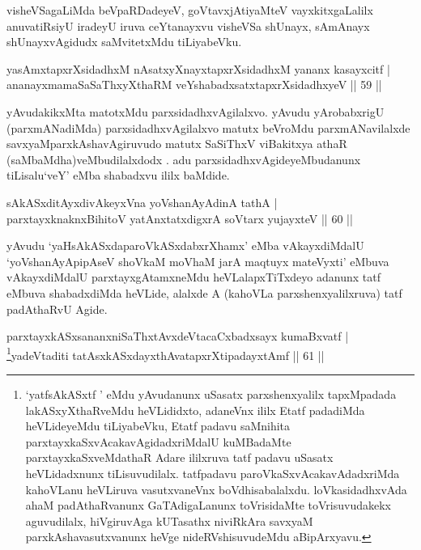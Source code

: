 \begin{artha}
visheVSagaLiMda beVpaRDadeyeV, goVtavxjAtiyaMteV vayxkitxgaLalilx anuvatiRsiyU iradeyU iruva ceYtanayxvu visheVSa shUnayx, sAmAnayx shUnayxvAgidudx saMvitetxMdu tiLiyabeVku.
\end{artha}


\begin{shl}
yasAmxtapxrXsidadhxM nAsatxyXnayxtapxrXsidadhxM yananx kasayxcitf |\\
ananayxmamaSaSaThxyXthaRM veYshabadxsatxtapxrXsidadhxyeV \hfill || 59 ||
\end{shl}

\begin{artha}
yAvudakikxMta matotxMdu parxsidadhxvAgilalxvo. yAvudu yArobabxrigU  (parxmANadiMda) parxsidadhxvAgilalxvo matutx beVroMdu parxmANavilalxde savxyaMparxkAshavAgiruvudo matutx SaSiThxV viBakitxya athaR (saMbaMdha)veMbudilalxdodx . adu parxsidadhxvAgideyeMbudanunx tiLisalu`veY' eMba shabadxvu ililx baMdide.
\end{artha}


\begin{shl}
sAkASxditAyxdivAkeyxVna yoV\s shanAyAdinA tathA |\\
parxtayxknaknxBihitoV yatAnxtatxdigxrA soV\s tarx yujayxteV \hfill || 60 ||
\end{shl}

\begin{artha}
yAvudu `yaHsAkASxdaparoVkASxdabxrXhamx' eMba vAkayxdiMdalU `yoV\s shanAyApipAseV shoVkaM moVhaM jarA maqtuyx mateVyxti' eMbuva vAkayxdiMdalU parxtayxgAtamxneMdu heVLalapxTiTxdeyo adanunx tatf eMbuva shabadxdiMda heVLide, alalxde A (kahoVLa parxshenxyalilxruva) tatf padAthaRvU Agide.
\end{artha}


\begin{shl}
parxtayxkASxsananxniSaThxtAvxdeVtacaCxbadxsayx kumaBxvatf |\\
\footnote{`yatfsAkASxtf ' eMdu yAvudanunx uSasatx parxshenxyalilx tapxMpadada lakASxyXthaRveMdu heVLididxto, adaneVnx ililx Etatf padadiMda heVLideyeMdu tiLiyabeVku, Etatf padavu saMnihita parxtayxkaSxvAcakavAgidadxriMdalU kuMBadaMte parxtayxkaSxveMdathaR Adare ililxruva tatf padavu uSasatx heVLidadxnunx tiLisuvudilalx. tatfpadavu paroVkaSxvAcakavAdadxriMda kahoVLanu heVLiruva vasutxvaneVnx boVdhisabalalxdu. loVkasidadhxvAda ahaM padAthaRvanunx GaTAdigaLanunx toVrisidaMte toVrisuvudakekx aguvudilalx, hiVgiruvAga kUTasathx niviRkAra savxyaM parxkAshavasutxvanunx heVge nideRVshisuvudeMdu aBipArxyavu.}yadeVtaditi tatAsxkASxdayxthAvatapxrXtipadayxtAmf \hfill || 61 ||
\end{shl}

